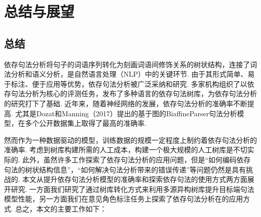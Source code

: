 
\chapter{总结与展望}


\section{总结}
依存句法分析将句子的词语序列转化为刻画词语间修饰关系的树状结构，连接了词法分析和语义分析，是自然语言处理（NLP）中的关键环节.
由于其形式简单、易于标注、便于应用等优势，依存句法分析被广泛采纳和研究. 多家机构组织了以依存句法分析为核心的评测任务，发布了多种语言的依存句法树库，为依存句法分析的研究打下了基础. 近年来，随着神经网络的发展，依存句法分析的准确率不断提高. 尤其是Dozat和Manning（2017）提出的基于图的BiaffineParser句法分析模型，在多个公开数据集上取得了最高的准确率.

然而作为一种数据驱动的模型，训练数据的规模一定程度上制约着依存句法分析的准确率. 考虑到树库构建所需的人工成本，构建一个极大规模的人工树库是不切实际的.
此外，虽然许多工作探索了依存句法分析的应用问题，但是“如何编码依存句法的树状结构信息”，“如何解决句法分析带来的错误传递”等问题仍然是具有挑战的.
本文从提升依存句法分析模型的准确率和探索依存句法的使用方式两方面展开研究. 一方面我们研究了通过树库转化方式来利用多源异构树库提升目标端句法模型性能，另一方面我们在意见角色标注任务上探索了依存句法分析在的应用方式. 总之，本文的主要工作如下：

